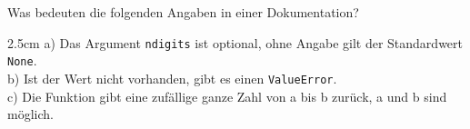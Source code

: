 \question[3]
Was bedeuten die folgenden Angaben in einer Dokumentation?
\begin{solutionbox}{2.5cm}
a) Das Argument \texttt{ndigits} ist optional, ohne Angabe gilt der Standardwert \texttt{None}. \\
b) Ist der Wert nicht vorhanden, gibt es einen \texttt{ValueError}. \\
c) Die Funktion gibt eine zufällige ganze Zahl von a bis b zurück, a und b sind möglich.
\end{solutionbox}
